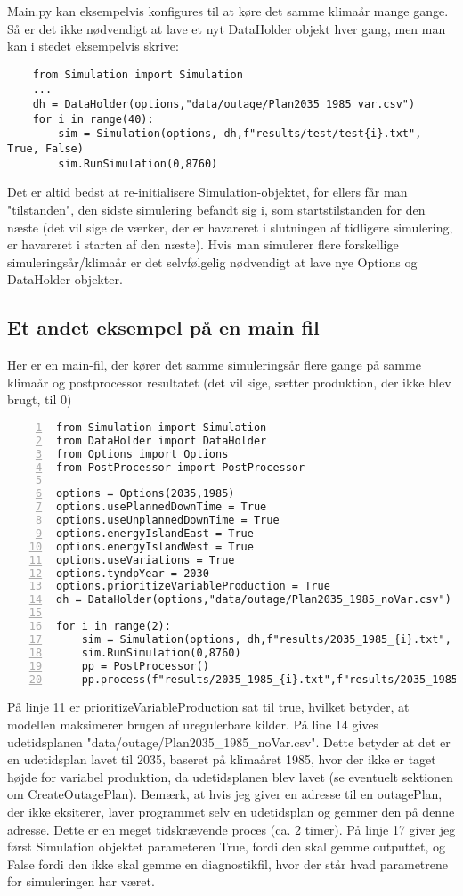 \documentclass{article}
\begin{document}
Main.py kan eksempelvis konfigures til at køre det samme klimaår mange gange. Så er det ikke nødvendigt at lave et nyt DataHolder objekt hver gang, men man kan i stedet eksempelvis skrive:
\begin{verbatim}
    from Simulation import Simulation
    ...
    dh = DataHolder(options,"data/outage/Plan2035_1985_var.csv")
    for i in range(40):
        sim = Simulation(options, dh,f"results/test/test{i}.txt", True, False)
        sim.RunSimulation(0,8760)
\end{verbatim}
Det er altid bedst at re-initialisere Simulation-objektet, for ellers får man "tilstanden", den sidste simulering befandt sig i, som startstilstanden for den næste (det vil sige de værker, der er havareret i slutningen af tidligere simulering, er havareret i starten af den næste). Hvis man simulerer flere forskellige simuleringsår/klimaår er det selvfølgelig nødvendigt at lave nye Options og DataHolder objekter. 
\subsection{Et andet eksempel på en main fil}
Her er en main-fil, der kører det samme simuleringsår flere gange på samme klimaår og postprocessor resultatet (det vil sige, sætter produktion, der ikke blev brugt, til 0)
\begin{Verbatim}[numbers=left,xleftmargin=5mm]
from Simulation import Simulation
from DataHolder import DataHolder
from Options import Options
from PostProcessor import PostProcessor

options = Options(2035,1985)
options.usePlannedDownTime = True
options.useUnplannedDownTime = True
options.energyIslandEast = True
options.energyIslandWest = True
options.useVariations = True
options.tyndpYear = 2030
options.prioritizeVariableProduction = True
dh = DataHolder(options,"data/outage/Plan2035_1985_noVar.csv")

for i in range(2):
    sim = Simulation(options, dh,f"results/2035_1985_{i}.txt", True, False)
    sim.RunSimulation(0,8760)
    pp = PostProcessor()
    pp.process(f"results/2035_1985_{i}.txt",f"results/2035_1985_{i}_pp.txt")
\end{Verbatim}
På linje 11 er prioritizeVariableProduction sat til true, hvilket betyder, at modellen maksimerer brugen af uregulerbare kilder. På line 14 gives udetidsplanen "data/outage/Plan2035\_1985\_noVar.csv". Dette betyder at det er en udetidsplan lavet til 2035, baseret på klimaåret 1985, hvor der ikke er taget højde for variabel produktion, da udetidsplanen blev lavet (se eventuelt sektionen om CreateOutagePlan). 
Bemærk, at hvis jeg giver en adresse til en outagePlan, der ikke eksiterer, laver programmet selv en udetidsplan og gemmer den på denne adresse. Dette er en meget tidskrævende proces (ca. 2 timer).
På linje 17 giver jeg først Simulation objektet parameteren True, fordi den skal gemme outputtet, og False fordi den ikke skal gemme en diagnostikfil, hvor der står hvad parametrene for simuleringen har været. 
\end{document}
